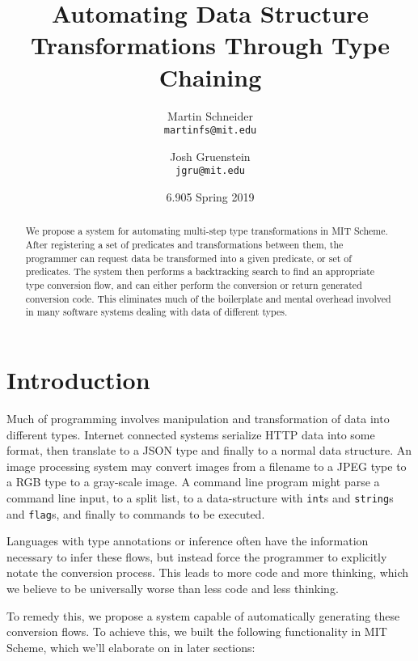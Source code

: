 \documentclass[letterpaper]{article}
\title{Automating Data Structure Transformations Through Type Chaining}
\author{
  Martin Schneider\\
  \texttt{martinfs@mit.edu} \and
  Josh Gruenstein\\
  \texttt{jgru@mit.edu}
}
\date{6.905 Spring 2019}
\begin{document}
 
\maketitle

\begin{abstract}
We propose a system for automating multi-step type transformations in MIT Scheme.  After registering a set of predicates and transformations between them, the programmer can request data be transformed into a given predicate, or set of predicates.  The system then performs a backtracking search to find an appropriate type conversion flow, and can either perform the conversion or return generated conversion code.  This eliminates much of the boilerplate and mental overhead involved in many software systems dealing with data of different types.
\end{abstract}

\section{Introduction}

Much of programming involves manipulation and transformation of data into different types.  Internet connected systems serialize HTTP data into some format, then translate to a JSON type and finally to a normal data structure.  An image processing system may convert images from a filename to a JPEG type to a RGB type to a gray-scale image.  A command line program might parse a command line input, to a split list, to a data-structure with \texttt{int}s and \texttt{string}s and \texttt{flag}s, and finally to commands to be executed.

Languages with type annotations or inference often have the information necessary to infer these flows, but instead force the programmer to explicitly notate the conversion process.  This leads to more code and more thinking, which we believe to be universally worse than less code and less thinking.

To remedy this, we propose a system capable of automatically generating these conversion flows.  To achieve this, we built the following functionality in MIT Scheme, which we'll elaborate on in later sections:
\end{document}

